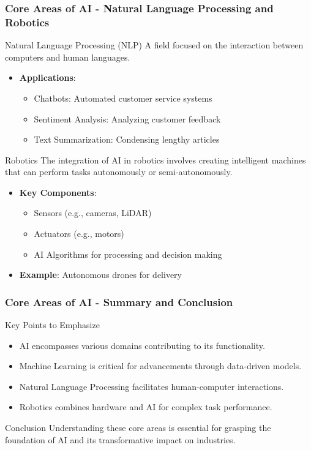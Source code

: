 \documentclass[aspectratio=169]{beamer}
\begin{document}
\begin{frame}[fragile]
    \frametitle{Core Areas of AI - Natural Language Processing and Robotics}
    \begin{block}{Natural Language Processing (NLP)}
        A field focused on the interaction between computers and human languages. 
    \end{block}
    \begin{itemize}
        \item \textbf{Applications}:
        \begin{itemize}
            \item Chatbots: Automated customer service systems
            \item Sentiment Analysis: Analyzing customer feedback
            \item Text Summarization: Condensing lengthy articles
        \end{itemize}
    \end{itemize}

    \begin{block}{Robotics}
        The integration of AI in robotics involves creating intelligent machines that can perform tasks autonomously or semi-autonomously.
    \end{block}
    \begin{itemize}
        \item \textbf{Key Components}:
        \begin{itemize}
            \item Sensors (e.g., cameras, LiDAR)
            \item Actuators (e.g., motors)
            \item AI Algorithms for processing and decision making
        \end{itemize}
        \item \textbf{Example}: Autonomous drones for delivery
    \end{itemize}
\end{frame}

\begin{frame}[fragile]
    \frametitle{Core Areas of AI - Summary and Conclusion}
    \begin{block}{Key Points to Emphasize}
        \begin{itemize}
            \item AI encompasses various domains contributing to its functionality.
            \item Machine Learning is critical for advancements through data-driven models.
            \item Natural Language Processing facilitates human-computer interactions.
            \item Robotics combines hardware and AI for complex task performance.
        \end{itemize}
    \end{block}
    
    \begin{block}{Conclusion}
        Understanding these core areas is essential for grasping the foundation of AI and its transformative impact on industries.
    \end{block}
\end{frame}
\end{document}
